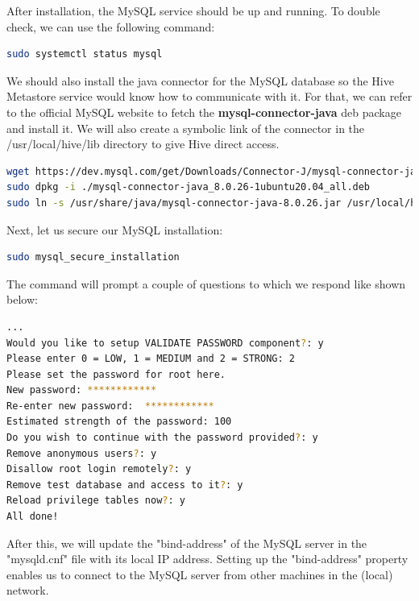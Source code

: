 \documentclass[12pt,english]{book}
\begin{document}
After installation, the MySQL service should be up and running.
To double check, we can use the following command:

\begin{lstlisting}[language=bash, frame=single, basicstyle=\footnotesize]
sudo systemctl status mysql
\end{lstlisting}

We should also install the java connector for the MySQL database so the Hive Metastore service would know how to communicate with it. For that, we can refer to the official MySQL website to fetch the \textbf{mysql-connector-java} deb package and install it. We will also create a symbolic link of the connector in the /usr/local/hive/lib directory to give Hive direct access.

\begin{lstlisting}[language=bash, frame=single, basicstyle=\footnotesize]
wget https://dev.mysql.com/get/Downloads/Connector-J/mysql-connector-java_8.0.26-1ubuntu20.04_all.deb
sudo dpkg -i ./mysql-connector-java_8.0.26-1ubuntu20.04_all.deb
sudo ln -s /usr/share/java/mysql-connector-java-8.0.26.jar /usr/local/hive/lib/
\end{lstlisting}

Next, let us secure our MySQL installation:

\begin{lstlisting}[language=bash, frame=single, basicstyle=\footnotesize]
sudo mysql_secure_installation
\end{lstlisting}

The command will prompt a couple of questions to which we respond like shown below:

\begin{lstlisting}[language=bash, frame=single, basicstyle=\footnotesize]
...
Would you like to setup VALIDATE PASSWORD component?: y
Please enter 0 = LOW, 1 = MEDIUM and 2 = STRONG: 2
Please set the password for root here.
New password: ************
Re-enter new password:  ************
Estimated strength of the password: 100 
Do you wish to continue with the password provided?: y
Remove anonymous users?: y
Disallow root login remotely?: y
Remove test database and access to it?: y
Reload privilege tables now?: y
All done! 
\end{lstlisting}

After this, we will update the "bind-address" of the MySQL server in the "mysqld.cnf" file with its local IP address.
Setting up the "bind-address" property enables us to connect to the MySQL server from other machines in the (local) network.
\end{document}
